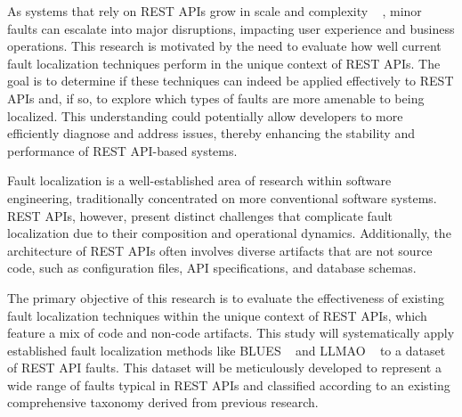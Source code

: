 \documentclass[conference]{IEEEtran}
\newcommand{\todo}[1]{\textcolor{red}{{\bfseries [[#1]]}}}
\begin{document}

    As systems that rely on REST APIs grow in scale and complexity  ~\cite{khare2004} , minor faults can escalate into major disruptions, impacting user experience and business operations. 
    This research is motivated by the need to evaluate how well current fault localization techniques perform in the unique context of REST APIs. 
    The goal is to determine if these techniques can indeed be applied effectively to REST APIs and, if so, to explore which types of faults are more amenable to being localized. 
    This understanding could potentially allow developers to more efficiently diagnose and address issues, thereby enhancing the stability and performance of REST API-based systems.




    Fault localization is a well-established area of research within software engineering, traditionally concentrated on more conventional software systems. 
    REST APIs, however, present distinct challenges that complicate fault localization due to their composition and operational dynamics. 
    Additionally, the architecture of REST APIs often involves diverse artifacts that are not source code, such as configuration files, API specifications, and database schemas.



    The primary objective of this research is to evaluate the effectiveness of existing fault localization techniques within the unique context of REST APIs, which feature a mix of code and non-code artifacts. 
    This study will systematically apply established fault localization methods like BLUES ~\cite{ManishBluesFaultLocalization} and LLMAO ~\cite{LLMAOFaultLocalization} to a dataset of REST API faults. 
    This dataset will be meticulously developed to represent a wide range of faults typical in REST APIs and classified according to an existing comprehensive taxonomy derived from previous research.
\end{document}

